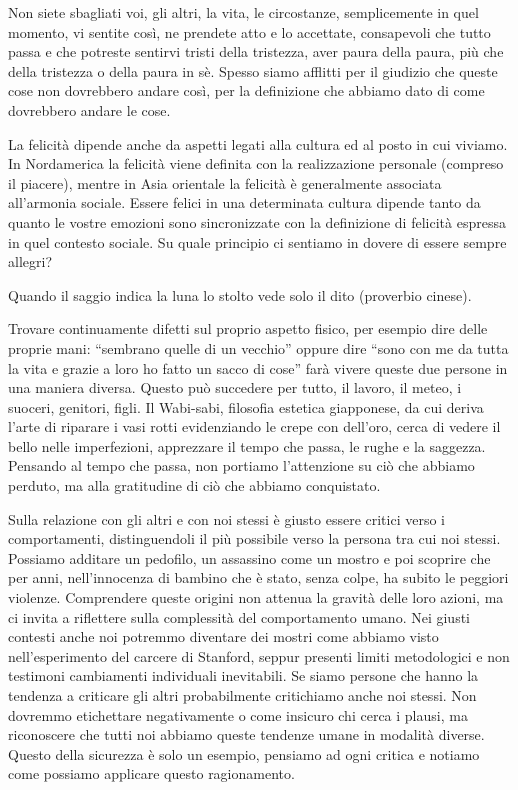 \documentclass[12pt]{book} %
\begin{document}
Non siete sbagliati voi, gli altri, la vita, le circostanze, semplicemente in quel momento, vi sentite così, ne prendete
atto e lo accettate, consapevoli che tutto passa e che potreste sentirvi tristi della tristezza, aver paura della
paura, più che della tristezza o della paura in sè. Spesso siamo afflitti per il giudizio che queste cose non dovrebbero
andare così, per la definizione che abbiamo dato di come dovrebbero andare le cose. 

La felicità dipende anche da aspetti legati alla cultura ed al posto in cui viviamo. In Nordamerica la felicità viene
definita con la realizzazione personale (compreso il piacere), mentre in Asia orientale la felicità è generalmente associata
all'armonia sociale. 
Essere felici in una determinata cultura dipende tanto da quanto le vostre emozioni sono sincronizzate con la
definizione di felicità espressa in quel contesto sociale. 
Su quale principio ci sentiamo in dovere di essere sempre allegri?

Quando il saggio indica la luna lo stolto vede solo il dito (proverbio cinese). 

Trovare continuamente difetti sul proprio aspetto fisico, per esempio dire delle proprie mani: “sembrano quelle di un
vecchio” oppure dire “sono con me da tutta la vita e grazie a loro ho fatto un sacco di cose” farà vivere queste due
persone in una maniera diversa. Questo può succedere per tutto, il lavoro, il meteo, i suoceri, genitori,
figli. Il Wabi-sabi, filosofia estetica giapponese, da cui deriva l'arte di riparare i vasi rotti evidenziando le crepe con dell'oro,
cerca di vedere il bello nelle imperfezioni, apprezzare il tempo che passa, le
rughe e la saggezza. Pensando al tempo che passa, non portiamo l'attenzione su ciò che abbiamo perduto, ma alla gratitudine di ciò che abbiamo conquistato.

Sulla relazione con gli altri e con noi stessi è giusto essere critici verso i comportamenti, distinguendoli il più possibile verso la persona tra cui noi stessi. 
Possiamo additare un pedofilo, un assassino
come un mostro e poi scoprire che per anni, nell'innocenza di bambino che è stato, senza colpe, ha
subito le peggiori violenze. Comprendere queste origini non attenua la gravità delle loro azioni, ma ci invita a riflettere sulla complessità del comportamento umano. Nei giusti contesti anche noi potremmo diventare dei mostri come abbiamo visto
nell'esperimento del carcere di Stanford, seppur presenti limiti metodologici e non testimoni cambiamenti individuali inevitabili.
Se siamo persone che hanno la tendenza a criticare gli altri
probabilmente critichiamo anche noi stessi. Non dovremmo etichettare negativamente o come insicuro chi cerca i
plausi, ma riconoscere che tutti noi abbiamo queste tendenze umane in modalità diverse. Questo della sicurezza è solo
un esempio, pensiamo ad ogni critica e notiamo come possiamo applicare questo ragionamento.
\end{document}
